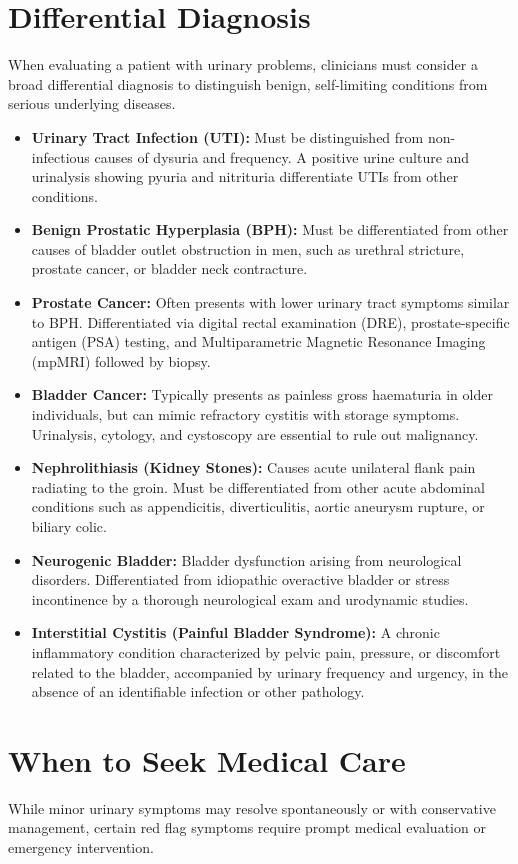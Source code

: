 \section*{Differential Diagnosis}
When evaluating a patient with urinary problems, clinicians must consider a broad differential diagnosis to distinguish benign, self-limiting conditions from serious underlying diseases.

\begin{itemize}
    \item \textbf{Urinary Tract Infection (UTI):} Must be distinguished from non-infectious causes of dysuria and frequency. A positive urine culture and urinalysis showing pyuria and nitrituria differentiate UTIs from other conditions.
    \item \textbf{Benign Prostatic Hyperplasia (BPH):} Must be differentiated from other causes of bladder outlet obstruction in men, such as urethral stricture, prostate cancer, or bladder neck contracture.
    \item \textbf{Prostate Cancer:} Often presents with lower urinary tract symptoms similar to BPH. Differentiated via digital rectal examination (DRE), prostate-specific antigen (PSA) testing, and Multiparametric Magnetic Resonance Imaging (mpMRI) followed by biopsy.
    \item \textbf{Bladder Cancer:} Typically presents as painless gross haematuria in older individuals, but can mimic refractory cystitis with storage symptoms. Urinalysis, cytology, and cystoscopy are essential to rule out malignancy.
    \item \textbf{Nephrolithiasis (Kidney Stones):} Causes acute unilateral flank pain radiating to the groin. Must be differentiated from other acute abdominal conditions such as appendicitis, diverticulitis, aortic aneurysm rupture, or biliary colic.
    \item \textbf{Neurogenic Bladder:} Bladder dysfunction arising from neurological disorders. Differentiated from idiopathic overactive bladder or stress incontinence by a thorough neurological exam and urodynamic studies.
    \item \textbf{Interstitial Cystitis (Painful Bladder Syndrome):} A chronic inflammatory condition characterized by pelvic pain, pressure, or discomfort related to the bladder, accompanied by urinary frequency and urgency, in the absence of an identifiable infection or other pathology.
\end{itemize}

\section*{When to Seek Medical Care}
While minor urinary symptoms may resolve spontaneously or with conservative management, certain red flag symptoms require prompt medical evaluation or emergency intervention.

